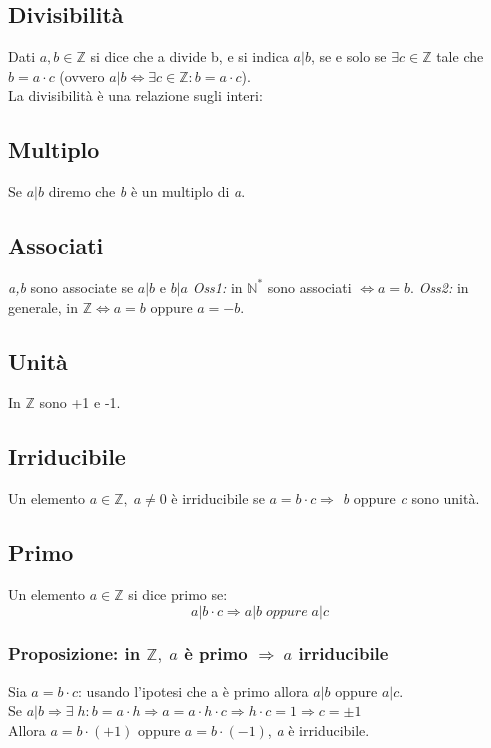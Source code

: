\subsection{Divisibilità} 
Dati \(a,b\in\mathbb{Z}\) si dice che a divide b, e si indica \(a|b\), se e solo se \(\exists c\in\mathbb{Z}\) tale che \(b=a\cdot c\) (ovvero \(a|b\Leftrightarrow\exists c\in\mathbb{Z}: b=a\cdot c\)).
\\La divisibilità è una relazione sugli interi:

\subsection{Multiplo} 
Se \(a|b\) diremo che \textit{b} è un multiplo di \textit{a}.

\subsection{Associati}
\textit{a,b} sono associate se \(a|b\) e \(b|a\)
\newline\textit{Oss1:} in \(\mathbb{N^*}\) sono associati \(\Leftrightarrow a=b\).
\newline\textit{Oss2:} in generale, in \(\mathbb{Z}\Leftrightarrow a=b\) oppure \(a=-b\).

\subsection{Unità}
In \(\mathbb{Z}\) sono +1 e -1.

\subsection{Irriducibile}
Un elemento \(a\in\mathbb{Z}, \; a\neq 0\) è irriducibile se \(a=b\cdot c\Rightarrow\) \textit{b} oppure \textit{c} sono unità.

\subsection{Primo}
Un elemento \(a\in\mathbb{Z}\) si dice primo se:
\[a|b\cdot c\Rightarrow a|b \;oppure\; a|c\]

\subsubsection{Proposizione: in \(\mathbb{Z},\; a\) è primo \(\Rightarrow\;a\) irriducibile}
Sia \(a=b\cdot c\): usando l'ipotesi che a è primo allora \(a|b\) oppure \(a|c\).
\\
Se \(a|b \Rightarrow\exists\; h : b=a\cdot h \Rightarrow a = a\cdot h\cdot c \Rightarrow h\cdot c=1\Rightarrow c=\pm 1\)
\\
Allora \(a=b\cdot (+1)\) oppure \(a=b\cdot (-1)\), \textit{a} è irriducibile.

